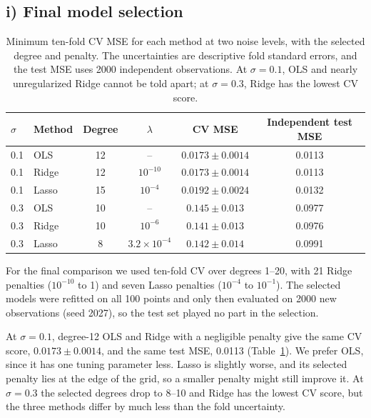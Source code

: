 \documentclass[aps,prb,reprint,superscriptaddress,nofootinbib,longbibliography,floatfix]{revtex4-2}
\begin{document}
\subsection{i) Final model selection}\label{sec:res_final}
\begin{table}[tb]
\caption{Minimum ten-fold CV MSE for each method at two noise levels, with the selected degree and penalty. The uncertainties are descriptive fold standard errors, and the test MSE uses 2000 independent observations. At $\sigma=0.1$, OLS and nearly unregularized Ridge cannot be told apart; at $\sigma=0.3$, Ridge has the lowest CV score.}\label{tab:final}
\begin{ruledtabular}
\begin{tabular}{llcccc}
$\sigma$ & Method & Degree & $\lambda$ & CV MSE & Independent test MSE \\ \hline
0.1 & OLS & 12 & -- & $\mathbf{0.0173}\pm0.0014$ & 0.0113 \\
0.1 & Ridge & 12 & $10^{-10}$ & $0.0173\pm0.0014$ & 0.0113 \\
0.1 & Lasso & 15 & $10^{-4}$ & $0.0192\pm0.0024$ & 0.0132 \\[2pt]
0.3 & OLS & 10 & -- & $0.145\pm0.013$ & 0.0977 \\
0.3 & Ridge & 10 & $10^{-6}$ & $\mathbf{0.141}\pm0.013$ & 0.0976 \\
0.3 & Lasso & 8 & $3.2\times10^{-4}$ & $0.142\pm0.014$ & 0.0991 \\
\end{tabular}
\end{ruledtabular}
\end{table}

For the final comparison we used ten-fold CV over degrees 1--20, with 21 Ridge penalties ($10^{-10}$ to 1) and seven Lasso penalties ($10^{-4}$ to $10^{-1}$). The selected models were refitted on all 100 points and only then evaluated on 2000 new observations (seed 2027), so the test set played no part in the selection.

At $\sigma=0.1$, degree-12 OLS and Ridge with a negligible penalty give the same CV score, $0.0173\pm0.0014$, and the same test MSE, 0.0113 (Table~\ref{tab:final}). We prefer OLS, since it has one tuning parameter less. Lasso is slightly worse, and its selected penalty lies at the edge of the grid, so a smaller penalty might still improve it. At $\sigma=0.3$ the selected degrees drop to 8--10 and Ridge has the lowest CV score, but the three methods differ by much less than the fold uncertainty.
\end{document}
